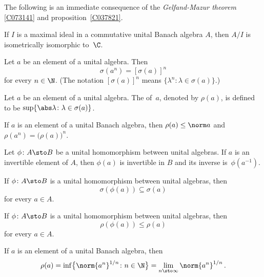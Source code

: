 The following is an immediate consequence of the \emph{Gelfand-Mazur theorem}
\ref{C073141} and proposition~\ref{C037821}.

\begin{cor}\label{C073147} If $I$ is a maximal ideal in a commutative unital Banach algebra $A$,
then $A/I$ is isometrically isomorphic to~$\C$.
\end{cor}

\begin{prop}\label{0006703fa} Let $a$ be an element of a unital algebra.  Then
   \[ \sigma(a^n) = [\sigma(a)]^n \]
for every $n \in \N$.  (The notation $[\sigma(a)]^n$ means $\{\lambda^n\colon \lambda \in
\sigma(a)\}$.)
\end{prop}

\begin{defn}\label{C073154}  Let $a$ be an element of a unital algebra.  The
 of~$a$, denoted by $\rho(a)$, is defined to be
$\sup\{\abs\lambda\colon \lambda \in \sigma(a)\}$.
\end{defn}

\begin{prop}\label{0006703} If $a$ is an element of a unital Banach algebra, then $\rho(a) \le
\norm a$ and $\rho(a^n) = \bigr(\rho(a)\bigr)^n$.
\end{prop}

\begin{prop} Let $\phi\colon A \sto B$ be a unital homomorphism between unital algebras. If $a$ is an invertible element of $A$,
then $\phi(a)$ is invertible in $B$ and its inverse is~$\phi(a^{-1})$.
\end{prop}

\begin{cor} If $\phi\colon A \sto B$ is a unital homomorphism between unital algebras, then
   \[ \sigma(\phi(a)) \subseteq \sigma(a) \]
for every $a \in A$.
\end{cor}

\begin{cor} If  $\phi\colon A \sto B$ is a unital homomorphism between unital algebras, then
   \[ \rho(\phi(a)) \le \rho(a) \]
for every $a \in A$.
\end{cor}

\begin{thm}\label{C073157} If $a$ is an element of a unital Banach
algebra, then
   \[ \rho(a) = \inf\bigl\{\norm{a^n}^{1/n}\colon n \in \N\bigr\}
                                = \lim_{n \sto \infty} \norm{a^n}^{1/n}\,. \]
\end{thm}

